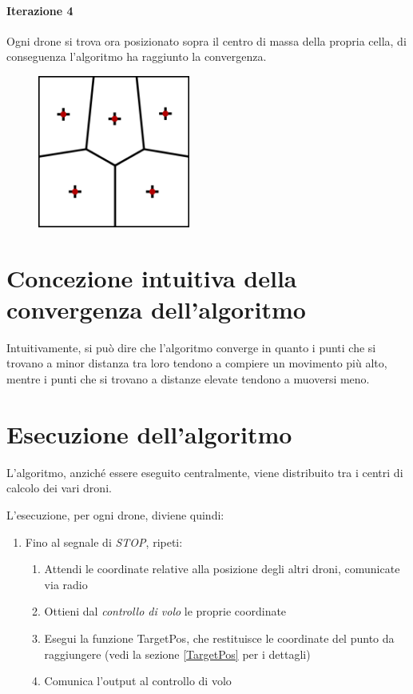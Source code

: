 \documentclass[11pt,a4paper]{report}
\newcommand{\name}[1]{{\ttfamily #1}}
\begin{document}
\paragraph{Iterazione 4}

Ogni drone si trova ora posizionato sopra il centro di massa della propria cella, di conseguenza l'algoritmo ha raggiunto la convergenza.

\begin{figure}[H]
\includegraphics[width=5cm]{lloyd_iterazione_4.png}
\centering
\end{figure}

\section{Concezione intuitiva della convergenza dell'algoritmo}

Intuitivamente, si può dire che l'algoritmo converge in quanto i punti che si trovano a minor distanza tra loro tendono a compiere un movimento più alto, mentre i punti che si trovano a distanze elevate tendono a muoversi meno.

\section{Esecuzione dell'algoritmo}

L'algoritmo, anziché essere eseguito centralmente, viene distribuito tra i centri di calcolo dei vari droni.

L'esecuzione, per ogni drone, diviene quindi:

\begin{enumerate}
	\item Fino al segnale di \textit{STOP}, ripeti:
	\begin{enumerate}
		\item Attendi le coordinate relative alla posizione degli altri droni, comunicate via radio
		\item Ottieni dal \textit{controllo di volo} le proprie coordinate
		\item Esegui la funzione \name{TargetPos}, che restituisce le coordinate del punto da raggiungere (vedi la sezione \ref{TargetPos} per i dettagli)
		\item Comunica l'output al controllo di volo
	\end{enumerate}
\end{enumerate}
\end{document}
